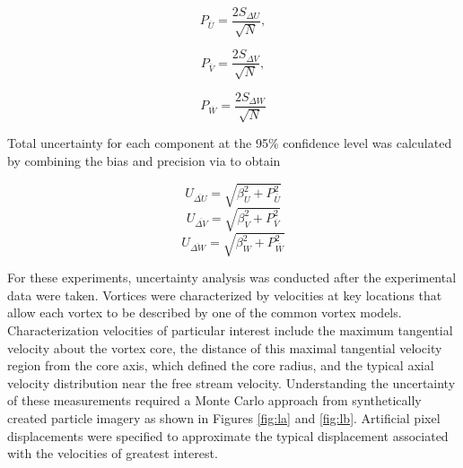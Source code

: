 \begin{equation}
P_{\overline{U}} = \frac{2 S_{\Delta U}}{\sqrt{N}},
\label{eq:Uprec}
\end{equation}

\begin{equation}
P_{\overline{V}} = \frac{2 S_{\Delta V}}{\sqrt{N}},
\label{eq:Vprec}
\end{equation}

\begin{equation}
P_{\overline{W}} = \frac{2 S_{\Delta W}}{\sqrt{N}}
\label{eq:Wprec}
\end{equation}

Total uncertainty for each component at the 95\% confidence level was 
calculated by combining the bias and precision via to obtain

\begin{equation}
U_{\overline{\Delta U}} = \sqrt{\beta_{U}^2 + P_{\overline{U}}^2}
\label{eq:Uuncert}
\end{equation}
\begin{equation}
U_{\overline{\Delta V}} = \sqrt{\beta_{V}^2 + P_{\overline{V}}^2}
\label{eq:Vuncert}
\end{equation}
\begin{equation}
U_{\overline{\Delta W}} = \sqrt{\beta_{W}^2 + P_{\overline{W}}^2}
\label{eq:Wuncert}
\end{equation}


For these experiments, uncertainty analysis was conducted after the 
experimental data were taken. Vortices were characterized by velocities at key 
locations that allow each vortex to be described by one of the common vortex 
models. Characterization velocities of particular interest include the maximum 
tangential velocity about the vortex core, the distance of this maximal 
tangential velocity region from the core axis, which defined the core radius, 
and the typical 
axial velocity distribution near the free stream velocity. Understanding the 
uncertainty of these measurements required a Monte Carlo approach from 
synthetically created particle imagery as shown in Figures \ref{fig:la} and 
\ref{fig:lb}. Artificial pixel displacements were specified to approximate the 
typical displacement associated with the velocities of greatest interest. 


